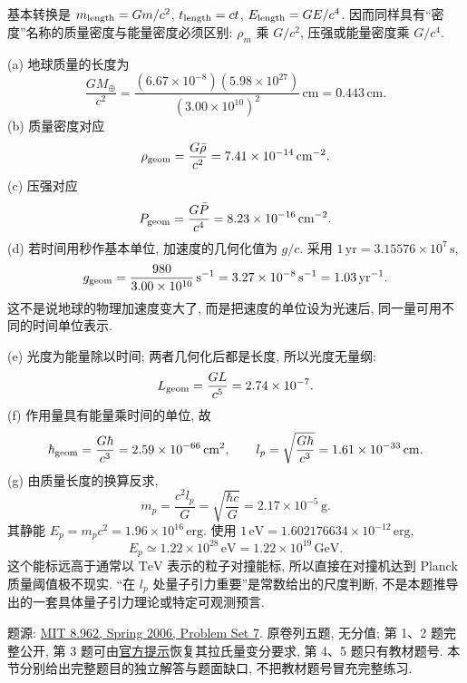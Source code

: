 \begin{solution}
基本转换是 $m_{\rm length}=Gm/c^2$, $t_{\rm length}=ct$, $E_{\rm length}=GE/c^4$. 因而同样具有“密度”名称的质量密度与能量密度必须区别: $\rho_m$ 乘 $G/c^2$, 压强或能量密度乘 $G/c^4$.

(a) 地球质量的长度为
\[
\frac{GM_\oplus}{c^2}
=\frac{(6.67\times10^{-8})(5.98\times10^{27})}{(3.00\times10^{10})^2}\,\mathrm{cm}
=0.443\,\mathrm{cm}.
\]
(b) 质量密度对应
\[
\rho_{\rm geom}=\frac{G\bar\rho}{c^2}
=7.41\times10^{-14}\,\mathrm{cm^{-2}}.
\]
(c) 压强对应
\[
P_{\rm geom}=\frac{G\bar P}{c^4}
=8.23\times10^{-16}\,\mathrm{cm^{-2}}.
\]
(d) 若时间用秒作基本单位, 加速度的几何化值为 $g/c$. 采用 $1\,\mathrm{yr}=3.15576\times10^7\,\mathrm s$,
\[
g_{\rm geom}=\frac{980}{3.00\times10^{10}}\,\mathrm{s^{-1}}
=3.27\times10^{-8}\,\mathrm{s^{-1}}
=1.03\,\mathrm{yr^{-1}}.
\]
这不是说地球的物理加速度变大了, 而是把速度的单位设为光速后, 同一量可用不同的时间单位表示.

(e) 光度为能量除以时间; 两者几何化后都是长度, 所以光度无量纲:
\[
L_{\rm geom}=\frac{GL}{c^5}=2.74\times10^{-7}.
\]
(f) 作用量具有能量乘时间的单位, 故
\[
\hbar_{\rm geom}=\frac{G\hbar}{c^3}
=2.59\times10^{-66}\,\mathrm{cm^2},\qquad
l_p=\sqrt{\frac{G\hbar}{c^3}}=1.61\times10^{-33}\,\mathrm{cm}.
\]
(g) 由质量长度的换算反求,
\[
m_p=\frac{c^2l_p}{G}=\sqrt{\frac{\hbar c}{G}}
=2.17\times10^{-5}\,\mathrm g.
\]
其静能 $E_p=m_pc^2=1.96\times10^{16}\,\mathrm{erg}$. 使用 $1\,\mathrm{eV}=1.602176634\times10^{-12}\,\mathrm{erg}$,
\[
E_p\simeq1.22\times10^{28}\,\mathrm{eV}=1.22\times10^{19}\,\mathrm{GeV}.
\]
这个能标远高于通常以 $\mathrm{TeV}$ 表示的粒子对撞能标, 所以直接在对撞机达到 Planck 质量阈值极不现实. “在 $l_p$ 处量子引力重要”是常数给出的尺度判断, 不是本题推导出的一套具体量子引力理论或特定可观测预言.
\end{solution}

\label{sec:gr-ps07}

题源: \href{https://ocw.mit.edu/courses/8-962-general-relativity-spring-2020/resources/mit8_962s20_pset07/}{MIT 8.962, Spring 2006, Problem Set 7}. 原卷列五题, 无分值; 第 1、2 题完整公开, 第 3 题可由\href{https://ocw.mit.edu/courses/8-962-general-relativity-spring-2020/resources/mit8_962s20_pset07_hint/}{官方提示}恢复其拉氏量变分要求, 第 4、5 题只有教材题号. 本节分别给出完整题目的独立解答与题面缺口, 不把教材题号冒充完整练习.

